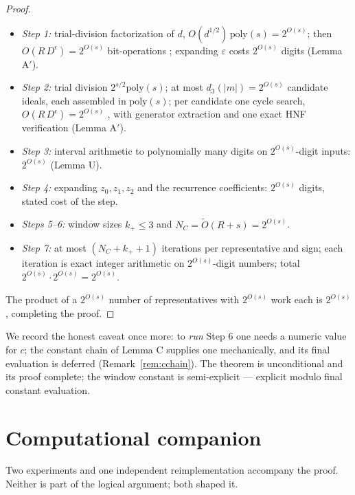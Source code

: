 \documentclass[11pt]{amsart}
\theoremstyle{plain}
\theoremstyle{remark}
\begin{document}
\begin{proof}
\begin{itemize}
\item \emph{Step 1:} trial-division factorization of $d$,
  $O(d^{1/2})\,\mathrm{poly}(s) = 2^{O(s)}$; then
  $O(R\,D^\epsilon) = 2^{O(s)}$ bit-operations
  \cite[Alg.~2.13, Prop.~2.14]{BW88}; expanding $\varepsilon$ costs
  $2^{O(s)}$ digits (Lemma A$'$).
\item \emph{Step 2:} trial division $2^{s/2}\mathrm{poly}(s)$; at
  most $d_3(|m|) = 2^{O(s)}$ candidate ideals, each assembled in
  $\mathrm{poly}(s)$; per candidate one cycle search,
  $O(R\,D^\epsilon) = 2^{O(s)}$ \cite[Prop.~4.5]{BW88}, with
  generator extraction and one exact HNF verification (Lemma A$'$).
\item \emph{Step 3:} interval arithmetic to polynomially many digits
  on $2^{O(s)}$-digit inputs: $2^{O(s)}$ (Lemma U).
\item \emph{Step 4:} expanding $z_0, z_1, z_2$ and the recurrence
  coefficients: $2^{O(s)}$ digits, stated cost of the step.
\item \emph{Steps 5--6:} window sizes $k_+ \le 3$ and
  $N_C = \widetilde O(R + s) = 2^{O(s)}$.
\item \emph{Step 7:} at most $(N_C + k_+ + 1)$ iterations per
  representative and sign; each iteration is exact integer
  arithmetic on $2^{O(s)}$-digit numbers; total
  $2^{O(s)}\cdot 2^{O(s)} = 2^{O(s)}$.
\end{itemize}

The product of a $2^{O(s)}$ number of representatives with
$2^{O(s)}$ work each is $2^{O(s)}$, completing the proof.
\end{proof}

We record the honest caveat once more: to \emph{run} Step 6 one needs
a numeric value for $c$; the constant chain of Lemma C supplies one
mechanically, and its final evaluation is deferred
(Remark~\ref{rem:cchain}). The theorem is unconditional and its proof
complete; the window constant is semi-explicit --- explicit modulo
final constant evaluation.

\section{Computational companion}\label{sec:companion}

Two experiments and one independent reimplementation accompany the
proof. Neither is part of the logical argument; both
shaped it.
\end{document}
